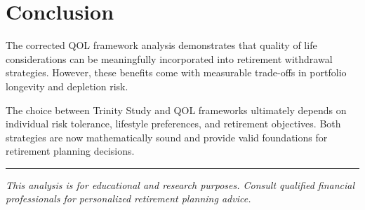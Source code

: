 \documentclass[11pt,letterpaper]{article}
\begin{document}
\section{Conclusion}

The corrected QOL framework analysis demonstrates that quality of life considerations can be meaningfully incorporated into retirement withdrawal strategies. However, these benefits come with measurable trade-offs in portfolio longevity and depletion risk.

The choice between Trinity Study and QOL frameworks ultimately depends on individual risk tolerance, lifestyle preferences, and retirement objectives. Both strategies are now mathematically sound and provide valid foundations for retirement planning decisions.

\vspace{1cm}
\hrule
\vspace{0.5cm}
\footnotesize
\textit{This analysis is for educational and research purposes. Consult qualified financial professionals for personalized retirement planning advice.}
\end{document}
